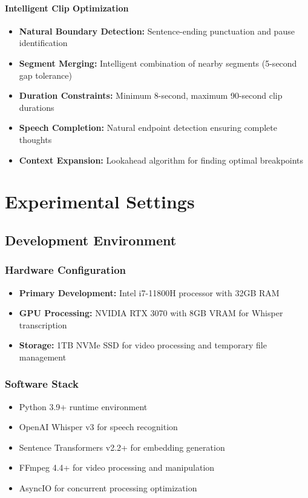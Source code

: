 \documentclass{bscs}
\begin{document}
\subsubsection{Intelligent Clip Optimization}

\begin{itemize}
\item \textbf{Natural Boundary Detection:} Sentence-ending punctuation and pause identification
\item \textbf{Segment Merging:} Intelligent combination of nearby segments (5-second gap tolerance)
\item \textbf{Duration Constraints:} Minimum 8-second, maximum 90-second clip durations
\item \textbf{Speech Completion:} Natural endpoint detection ensuring complete thoughts
\item \textbf{Context Expansion:} Lookahead algorithm for finding optimal breakpoints
\end{itemize}

\chapter{Experimental Settings}

\section{Development Environment}

\subsection{Hardware Configuration}

\begin{itemize}
\item \textbf{Primary Development:} Intel i7-11800H processor with 32GB RAM
\item \textbf{GPU Processing:} NVIDIA RTX 3070 with 8GB VRAM for Whisper transcription
\item \textbf{Storage:} 1TB NVMe SSD for video processing and temporary file management
\end{itemize}

\subsection{Software Stack}

\begin{itemize}
\item Python 3.9+ runtime environment
\item OpenAI Whisper v3 for speech recognition
\item Sentence Transformers v2.2+ for embedding generation
\item FFmpeg 4.4+ for video processing and manipulation
\item AsyncIO for concurrent processing optimization
\end{itemize}
\end{document}
